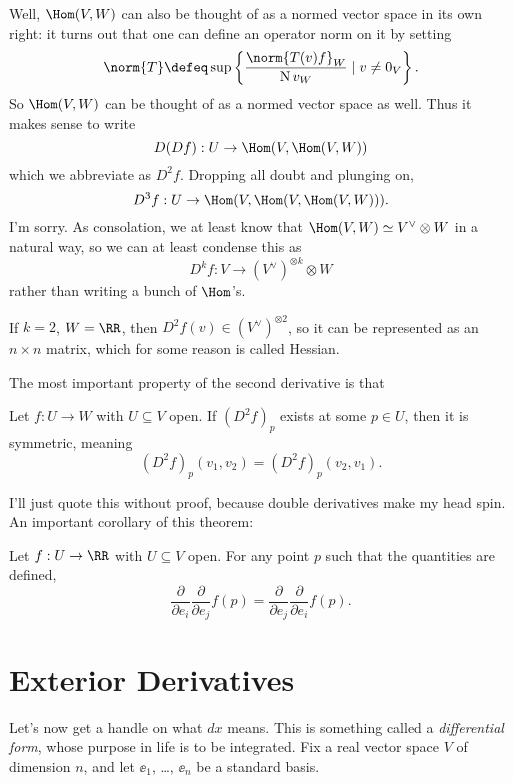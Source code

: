 Well, $\Hom(V,W)$ can also be thought of as a normed vector space in its own right:
it turns out that one can define an operator norm on it by setting
\[ \norm{T} \defeq \sup \left\{ \frac{\norm{T(v)f}_W}{\Norm{v}_W} \mid v \neq 0_V \right\}. \] 
So $\Hom(V,W)$ can be thought of as a normed vector space as well.
Thus it makes sense to write
\[ D(Df) : U \to \Hom(V,\Hom(V,W)) \]
which we abbreviate as $D^2 f$. Dropping all doubt and plunging on,
\[ D^3f : U \to \Hom(V, \Hom(V,\Hom(V,W))). \]
I'm sorry.
As consolation, we at least know that $\Hom(V,W) \simeq V^\vee \otimes W$ in a natural way,
so we can at least condense this as
\[ D^kf : V \to (V^\vee)^{\otimes k} \otimes W \]
rather than writing a bunch of $\Hom$'s.
\begin{remark}
	If $k=2$, $W = \RR$, then $D^2f(v) \in (V^\vee)^{\otimes 2}$,
	so it can be represented as an $n \times n$ matrix, which for some reason is called Hessian.
\end{remark}
The most important property of the second derivative is that
\begin{theorem}
	[Symmetry of $Df^2$]
	Let $f : U \to W$ with $U \subseteq V$ open.
	If $(D^2f)_p$ exists at some $p \in U$, then it is symmetric, meaning
	\[ (D^2f)_p(v_1, v_2) = (D^2f)_p(v_2, v_1). \]
\end{theorem}
I'll just quote this without proof, because double derivatives make my head spin.
An important corollary of this theorem:
\begin{corollary}
	Let $f : U \to \RR$ with $U \subseteq V$ open.
	For any point $p$ such that the quantities are defined,
	\[
		\frac{\partial}{\partial e_i}
		\frac{\partial}{\partial e_j}
		f(p)
		=
		\frac{\partial}{\partial e_j}
		\frac{\partial}{\partial e_i}
		f(p).
	\]
\end{corollary}

\section{Exterior Derivatives}
Let's now get a handle on what $dx$ means. This is something called a \emph{differential form},
whose purpose in life is to be integrated.
Fix a real vector space $V$ of dimension $n$, and let $\ee_1$, \dots, $\ee_n$ be a standard basis.

